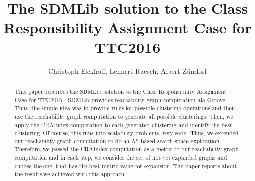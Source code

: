 \documentclass[submission,copyright,creativecommons]{eptcs}
\begin{document}





\pagestyle{headings}

\title{The SDMLib solution to the Class Responsibility Assignment Case for TTC2016} 
\author{Christoph Eickhoff, Lennert Raesch, Albert Z{\"u}ndorf
}

\def\authorrunning{ Albert Z{\"u}ndorf}
\def\titlerunning{The SDMLib solution for TTC2016}

\maketitle

\begin{abstract}

This paper describes the SDMLib solution to the Class Responsibility Assignment Case for TTC2016
\cite{ttc2016-case}. SDMLib provides reachability graph computation ala Groove. Thus, 
the simple idea was to provide rules for possible clustering operations and then use the
reachability graph computation to generate all possible clusterings. Then, we apply the
CRAIndex computation to each generated clustering and identify the best clustering. Of course,
this runs into scalability problems, very soon. Thus, we extended our reachability graph 
computation to do an A* based search space exploration. Therefore, we passed the CRAIndex 
computation as a metric to our reachability graph computation and in each step, we consider 
the set of not yet expanded graphs and choose the one, that has the best metric value for 
expansion. The paper reports about the results we achieved with this approach.  
   
  
\end{abstract}
\end{document}
